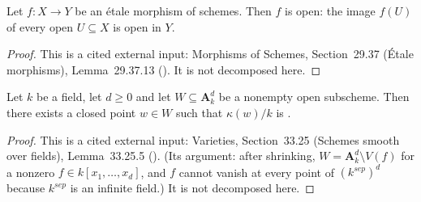 \begin{lemma}
\label{lem:pc-etale-open}
Let $f:X\to Y$ be an \'etale morphism of schemes.  Then $f$ is open:
the image $f(U)$ of every open $U\subseteq X$ is open in $Y$.
\end{lemma}
\begin{proof}
This is a cited external input: Morphisms of Schemes, Section~29.37
(\'Etale morphisms), Lemma~29.37.13
().  It is not decomposed
here.
\end{proof}

\begin{lemma}
\label{lem:pc-affine-space-separable-closed-point}
Let $k$ be a field, let $d\ge0$ and let $W\subseteq\mathbf A^d_k$ be a
nonempty open subscheme.  Then there exists a closed point $w\in W$
such that $\kappa(w)/k$ is
.
\end{lemma}
\begin{proof}
This is a cited external input: Varieties, Section~33.25 (Schemes
smooth over fields), Lemma~33.25.5
().  (Its argument: after
shrinking, $W=\mathbf A^d_k\setminus V(f)$ for a nonzero
$f\in k[x_1,\dots,x_d]$, and $f$ cannot vanish at every point of
$(k^{sep})^d$ because $k^{sep}$ is an infinite field.)  It is not
decomposed here.
\end{proof}


